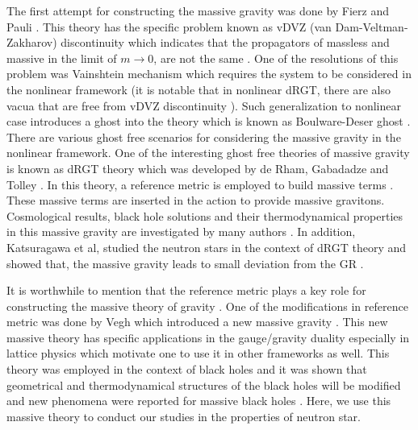\documentclass[aps]{revtex4}
\begin{document}
The first attempt for constructing the massive gravity was done by
Fierz and Pauli \cite{FierzI}. This theory has the specific
problem known as vDVZ (van Dam-Veltman-Zakharov) discontinuity
which indicates that the propagators of
massless and massive in the limit of $m\rightarrow 0$, are not the same \cite%
{van Dam,Zakharov,DeserW}. One of the resolutions of this problem
was Vainshtein mechanism which requires the system to be
considered in the nonlinear framework \cite{Vainshtein} (it is
notable that in nonlinear dRGT, there are also vacua that are free
from vDVZ discontinuity \cite{Zhou1}). Such generalization to
nonlinear case introduces a ghost into the theory which is known
as Boulware-Deser ghost \cite{Boulware}. There are various ghost
free scenarios for considering the massive gravity in the
nonlinear framework. One of the interesting ghost free theories of
massive gravity is known as dRGT theory which was developed by de
Rham, Gabadadze and Tolley \cite{de RhamGT,Hinterbichler}. In this
theory, a reference metric is employed to build massive terms
\cite{de RhamGT,Hinterbichler,HassanRI,HassanRS}. These massive
terms are inserted in the action to provide massive gravitons.
Cosmological results, black hole solutions and their
thermodynamical properties in this massive gravity are
investigated by many authors
\cite{Fasiello,CaiEGS,BambaHMNS,CaiS,GoonGH,HeisenbergKY,SolomonEA,PanC,KodamaA,BabichevF,BabichevB,SureshMP,LiLX,Zhou2,Zhou3,Zou}.
In addition, Katsuragawa et al, studied the neutron stars in the
context of dRGT theory and showed that, the massive gravity leads
to small deviation from the GR \cite{Katsuragawa}.


It is worthwhile to mention that the reference metric plays a key role for
constructing the massive theory of gravity \cite{review}. One of the
modifications in reference metric was done by Vegh which introduced a new
massive gravity \cite{Vegh}. This new massive theory has specific
applications in the gauge/gravity duality especially in lattice physics
which motivate one to use it in other frameworks as well. This theory was
employed in the context of black holes and it was shown that geometrical and
thermodynamical structures of the black holes will be modified and new
phenomena were reported for massive black holes \cite%
{CaiHPZ,HendiEPJHEP2015,XuCH,GhoshTW,HendiPEJHEP,HendiEPJHEP2016,SureshK,Upadhyay,Rappid}.
Here, we use this massive theory to conduct our studies in the
properties of neutron star.
\end{document}
